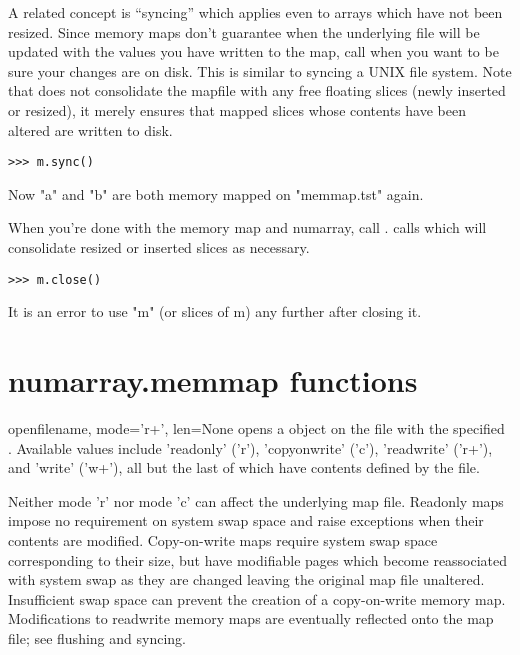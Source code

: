 A related concept is ``syncing'' which applies even to arrays which
have not been resized.  Since memory maps don't guarantee when the
underlying file will be updated with the values you have written to
the map, call  when you want to be sure your changes
are on disk.  This is similar to syncing a UNIX file system.  Note
that  does not consolidate the mapfile with any free
floating slices (newly inserted or resized), it merely ensures that
mapped slices whose contents have been altered are written to disk.

\begin{verbatim}
>>> m.sync()
\end{verbatim}

Now "a" and "b" are both memory mapped on "memmap.tst" again.

When you're done with the memory map and numarray, call
.  calls  which will
consolidate resized or inserted slices as necessary.

\begin{verbatim}
>>> m.close()
\end{verbatim}

It is an error to use "m" (or slices of m) any further after closing
it.

\section{numarray.memmap functions}
\label{sec:memmap-functions}

\begin{funcdesc}{open}{filename, mode='r+', len=None}
\label{func:memmap-open}
 opens a  object on the file
 with the specified .  Available 
values include 'readonly' ('r'), 'copyonwrite' ('c'), 'readwrite'
('r+'), and 'write' ('w+'), all but the last of which have contents
defined by the file.

Neither mode 'r' nor mode 'c' can affect the underlying map file.
Readonly maps impose no requirement on system swap space and raise
exceptions when their contents are modified.  Copy-on-write maps
require system swap space corresponding to their size, but have
modifiable pages which become reassociated with system swap as they
are changed leaving the original map file unaltered.  Insufficient
swap space can prevent the creation of a copy-on-write memory map.
Modifications to readwrite memory maps are eventually reflected onto
the map file;  see flushing and syncing.
\end{funcdesc}
   
